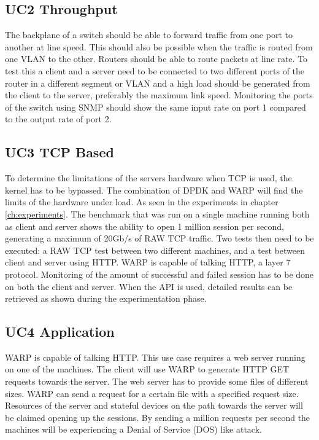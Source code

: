 \subsection{UC2 Throughput}
The backplane of a switch should be able to forward traffic from one port to another at line speed. This should also be possible when the traffic is routed from one VLAN to the other. Routers should be able to route packets at line rate. To test this a client and a server need to be connected to two different ports of the router in a different segment or VLAN and a high load should be generated from the client to the server, preferably the maximum link speed. Monitoring the ports of the switch using SNMP should show the same input rate on port 1 compared to the output rate of port 2.    

\subsection{UC3 TCP Based}
To determine the limitations of the servers hardware when TCP is used, the kernel has to be bypassed. The combination of DPDK and WARP will find the limits of the hardware under load. As seen in the experiments in chapter \ref{ch:experiments}. The benchmark that was run on a single machine running both as client and server shows the ability to open 1 million session per second, generating a maximum of 20Gb/s of RAW TCP traffic. Two tests then need to be executed: a RAW TCP test between two different machines, and a test between client and server using HTTP. WARP is capable of talking HTTP, a layer 7 protocol. Monitoring of the amount of successful and failed session has to be done on both the client and server. When the API is used, detailed results can be retrieved as shown during the experimentation phase.   

\subsection{UC4 Application}
WARP is capable of talking HTTP. This use case requires a web server running on one of the machines. The client will use WARP to generate HTTP GET requests towards the server. The web server has to provide some files of different sizes. WARP can send a request for a certain file with a specified request size. Resources of the server and stateful devices on the path towards the server will be claimed opening up the sessions. By sending a million requests per second the machines will be experiencing a Denial of Service (DOS) like attack.

